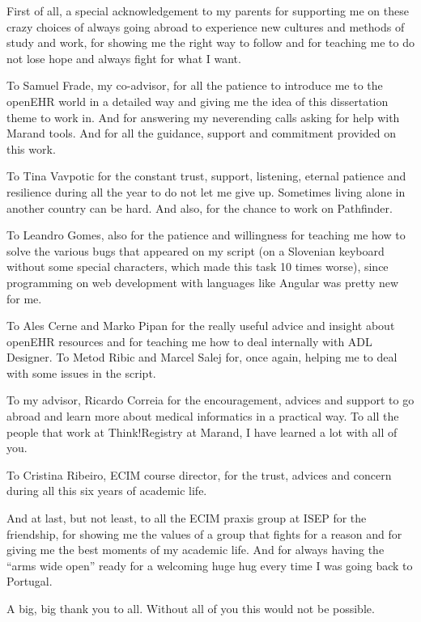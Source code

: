 \documentclass[mim_thesis.tex]{subfiles}
\begin{document}
First of all, a special acknowledgement to my parents for supporting me on these crazy choices of always going abroad to experience new cultures and methods of study and work, for showing me the right way to follow and for teaching me to do not lose hope and always fight for what I want.

To Samuel Frade, my co-advisor, for all the patience to introduce me to the openEHR world in a detailed way and giving me the idea of this dissertation theme to work in. And for answering my neverending calls asking for help with Marand tools. And for all the guidance, support and commitment provided on this work. 

To Tina Vavpotic for the constant trust, support, listening, eternal patience and resilience during all the year to do not let me give up. Sometimes living alone in another country can be hard. And also, for the chance to work on Pathfinder.  

To Leandro Gomes, also for the patience and willingness for teaching me how to solve the various bugs that appeared on my script (on a Slovenian keyboard without some special characters, which made this task 10 times worse), since programming on web development with languages like Angular was pretty new for me.

To Ales Cerne and Marko Pipan for the really useful advice and insight about openEHR resources and for teaching me how to deal internally with ADL Designer. To Metod Ribic and Marcel Salej for, once again, helping me to deal with some issues in the script.

To my advisor, Ricardo Correia for the encouragement, advices and support to go abroad and learn more about medical informatics in a practical way.
To all the people that work at Think!Registry at Marand, I have learned a lot with all of you.

To Cristina Ribeiro, ECIM course director, for the trust, advices and concern during all this six years of academic life. 

And at last, but not least, to all the ECIM praxis group at ISEP for the friendship, for showing me the values of a group that fights for a reason and for giving me the best moments of my academic life. And for always having the “arms wide open” ready for a welcoming huge hug every time I was going back to Portugal. 

A big, big thank you to all. Without all of you this would not be possible.
\end{document}
